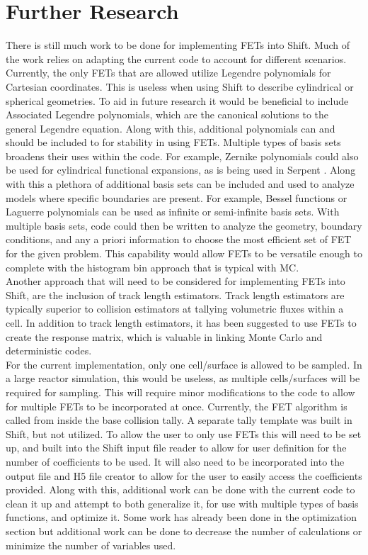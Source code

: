 \documentclass[10tma4paper]{article}
\begin{document}
\section{Further Research}\label{further}
There is still much work to be done for implementing FETs into Shift. Much of the work relies on adapting the current code to account for different scenarios. Currently, the only FETs that are allowed utilize Legendre polynomials for Cartesian coordinates. This is useless when using Shift to describe cylindrical or spherical geometries. To aid in future research it would be beneficial to include Associated Legendre polynomials, which are the canonical solutions to the general Legendre equation. Along with this, additional polynomials can and should be included to for stability in using FETs. Multiple types of basis sets broadens their uses within the code. For example, Zernike polynomials could also be used for cylindrical functional expansions, as is being used in Serpent \cite{AdvancementSerpent}\cite{PreliminarySerpent}. Along with this a plethora of additional basis sets can be included and used to analyze models where specific boundaries are present. For example, Bessel functions or Laguerre polynomials can be used as infinite or semi-infinite basis sets. With multiple basis sets, code could then be written to analyze the geometry, boundary conditions, and any a priori information to choose the most efficient set of FET for the given problem. This capability would allow FETs to be versatile enough to complete with the histogram bin approach that is typical with MC.
\\
Another approach that will need to be considered for implementing FETs into Shift, are the inclusion of track length estimators. Track length estimators are typically superior to collision estimators at tallying volumetric fluxes within a cell. In addition to track length estimators, it has been suggested to use FETs to create the response matrix, which is valuable in linking Monte Carlo and deterministic codes.
\\
For the current implementation, only one cell/surface is allowed to be sampled. In a large reactor simulation, this would be useless, as multiple cells/surfaces will be required for sampling. This will require minor modifications to the code to allow for multiple FETs to be incorporated at once. Currently, the FET algorithm is called from inside the base collision tally. A separate tally template was built in Shift, but not utilized. To allow the user to only use FETs this will need to be set up, and built into the Shift input file reader to allow for user definition for the number of coefficients to be used. It will also need to be incorporated into the output file and H5 file creator to allow for the user to easily access the coefficients provided. Along with this, additional work can be done with the current code to clean it up and attempt to both generalize it, for use with multiple types of basis functions, and optimize it. Some work has already been done in the optimization section but additional work can be done to decrease the number of calculations or minimize the number of variables used.
\end{document}
